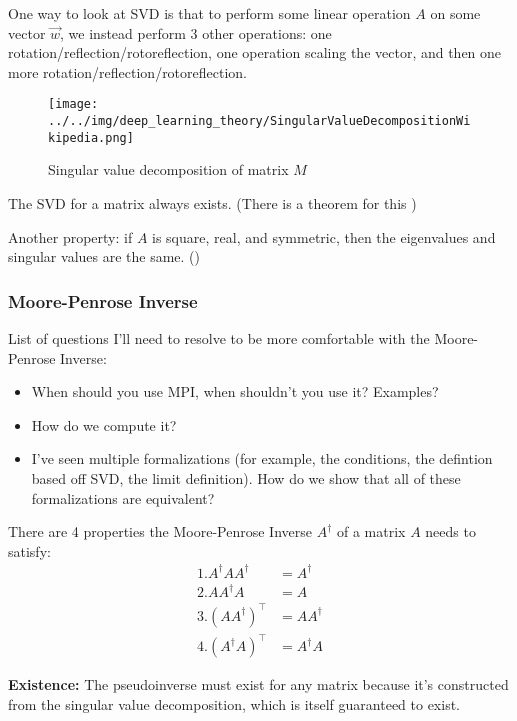 \documentclass[answers,12pt]{exam}
\begin{document}
One way to look at SVD is that to perform some linear operation $A$ on some vector $\vec{w}$, we instead perform 3 other operations:
one rotation/reflection/rotoreflection, one operation scaling the vector, and then one more rotation/reflection/rotoreflection.

\begin{figure}
    \centering
    \texttt{[image: ../../img/deep\_learning\_theory/SingularValueDecompositionWikipedia.png]}
    \caption{Singular value decomposition of matrix $M$}
\end{figure}


The SVD for a matrix always exists.
(There is a theorem for this )

Another property: if $A$ is square, real, and symmetric, then the eigenvalues and singular values are the same. ()


\FloatBarrier{}

\subsubsection{Moore-Penrose Inverse}
List of questions I'll need to resolve to be more comfortable with the Moore-Penrose Inverse:
\begin{itemize}
    \item When should you use MPI, when shouldn't you use it?
    Examples?
    \item How do we compute it?
    \item I've seen multiple formalizations (for example, the conditions, the defintion based off SVD, the limit definition).
    How do we show that all of these formalizations are equivalent?
\end{itemize}

There are 4 properties the Moore-Penrose Inverse $A^{\dagger}$ of a matrix $A$ needs to satisfy:
\begin{align*}
    1. A^{\dagger} A A^{\dagger} &= A^{\dagger} \\
    2. A A^{\dagger} A &= A \\
    3. {(A A^{\dagger})}^{\top} &= A A^{\dagger} \\
    4. {(A^{\dagger} A)}^{\top} &= A^{\dagger} A
\end{align*}

\textbf{Existence:} 
The pseudoinverse must exist for any matrix because it's constructed from the singular value decomposition, which is itself guaranteed to exist.
\end{document}
